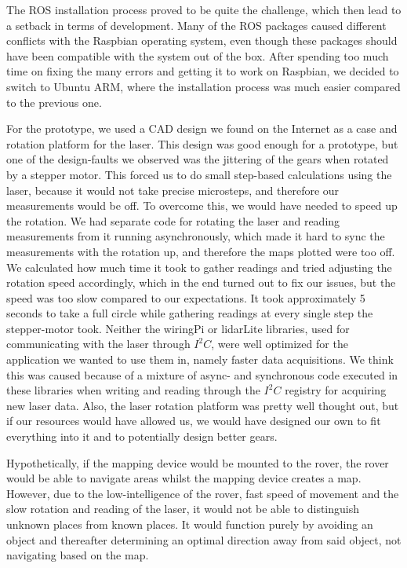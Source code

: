 The ROS installation process proved to be quite the challenge, which then lead to a setback in terms of development. Many of the ROS packages caused different conflicts with the Raspbian operating system, even though these packages should have been compatible with the system out of the box. After spending too much time on fixing the many errors and getting it to work on Raspbian, we decided to switch to Ubuntu ARM, where the installation process was much easier compared to the previous one.

For the prototype, we used a CAD design we found on the Internet as a case and rotation platform for the laser. This design was good enough for a prototype, but one of the design-faults we observed was the jittering of the gears when rotated by a stepper motor. This forced us to do small step-based calculations using the laser, because it would not take precise microsteps, and therefore our measurements would be off. To overcome this, we would have needed to speed up the rotation. We had separate code for rotating the laser and reading measurements from it running asynchronously, which made it hard to sync the measurements with the rotation up, and therefore the maps plotted were too off. We calculated how much time it took to gather readings and tried adjusting the rotation speed accordingly, which in the end turned out to fix our issues, but the speed was too slow compared to our expectations. It took approximately 5 seconds to take a full circle while gathering readings at every single step the stepper-motor took. Neither the wiringPi or lidarLite libraries, used for communicating with the laser through $I^2C$, were well optimized for the application we wanted to use them in, namely faster data acquisitions. We think this was caused because of a mixture of async- and synchronous code executed in these libraries when writing and reading through the $I^2C$ registry for acquiring new laser data. Also, the laser rotation platform was pretty well thought out, but if our resources would have allowed us, we would have designed our own to fit everything into it and to potentially design better gears.

Hypothetically, if the mapping device would be mounted to the rover, the rover would be able to navigate areas whilst the mapping device creates a map. However, due to the low-intelligence of the rover, fast speed of movement and the slow rotation and reading of the laser, it would not be able to distinguish unknown places from known places. It would function purely by avoiding an object and thereafter determining an optimal direction away from said object, not navigating based on the map. 

